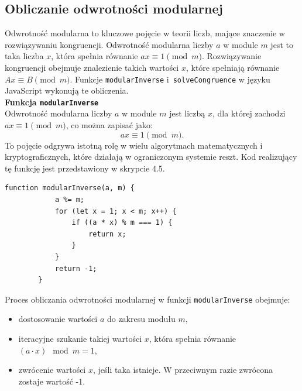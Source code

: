 \documentclass{SGGW-thesis}
\begin{document}
	\subsection{Obliczanie odwrotności modularnej}
	Odwrotność modularna to kluczowe pojęcie w teorii liczb, mające znaczenie w rozwiązywaniu kongruencji. Odwrotność modularna liczby \(a\) w module \(m\) jest to taka liczba \(x\), która spełnia równanie \(ax \equiv 1 \pmod{m}\). Rozwiązywanie kongruencji obejmuje znalezienie takich wartości \(x\), które spełniają równanie \(Ax \equiv B \pmod{m}\). Funkcje \texttt{modularInverse} i~\texttt{solveCongruence} w języku JavaScript wykonują te obliczenia.
	\vspace{1em}
	\\
	\textbf{Funkcja \texttt{modularInverse}}
	\vspace{1em}
	\\
	Odwrotność modularna liczby \(a\) w module \(m\) jest liczbą \(x\), dla której zachodzi \(ax \equiv 1 \pmod{m}\), co można zapisać jako:
	\begin{equation}
		ax \equiv 1 \pmod{m}.
	\end{equation}
	To pojęcie odgrywa istotną rolę w wielu algorytmach matematycznych i kryptograficznych, które działają w ograniczonym systemie reszt. Kod realizujący tę funkcję jest przedstawiony w skrypcie 4.5.
	\vspace{1em}
	\begin{lstlisting}[caption=Funkcja obliczająca odwrotność modularną liczby \(a\) w module \(m\) w JavaScript]
		function modularInverse(a, m) {
			a %= m;
			for (let x = 1; x < m; x++) {
				if ((a * x) % m === 1) {
					return x;
				}
			}
			return -1;
		}
	\end{lstlisting}
	\vspace{1em}
	Proces obliczania odwrotności modularnej w funkcji \texttt{modularInverse} obejmuje:
	\begin{itemize}
		\item dostosowanie wartości \(a\) do zakresu modułu \(m\),
		\item iteracyjne szukanie takiej wartości \(x\), która spełnia równanie \((a \cdot x) \mod m = 1\),
		\item zwrócenie wartości \(x\), jeśli taka istnieje. W przeciwnym razie zwrócona zostaje wartość -1.
	\end{itemize}
	\newpage
	
\end{document}
